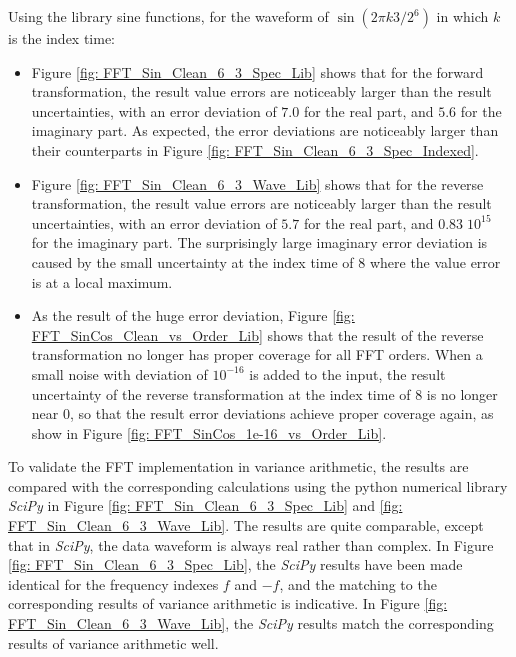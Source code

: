 \documentclass[twoside]{article}
\numberwithin{equation}{section}
\begin{document}
Using the library sine functions, for the waveform of $\sin(2\pi k 3/2^6)$ in which $k$ is the index time:
\begin{itemize}
\item Figure \ref{fig: FFT_Sin_Clean_6_3_Spec_Lib} shows that for the forward transformation, the result value errors are noticeably larger than the result uncertainties, with an error deviation of $7.0$ for the real part, and $5.6$ for the imaginary part.
As expected, the error deviations are noticeably larger than their counterparts in Figure \ref{fig: FFT_Sin_Clean_6_3_Spec_Indexed}.

\item Figure \ref{fig: FFT_Sin_Clean_6_3_Wave_Lib} shows that for the reverse transformation, the result value errors are noticeably larger than the result uncertainties, with an error deviation of $5.7$ for the real part, and $	0.83 \; 10^{15}$ for the imaginary part. 
The surprisingly large imaginary error deviation is caused by the small uncertainty at the index time of $8$ where the value error is at a local maximum.

\item As the result of the huge error deviation, Figure \ref{fig: FFT_SinCos_Clean_vs_Order_Lib} shows that the result of the reverse transformation no longer has proper coverage for all FFT orders.
When a small noise with deviation of $10^{-16}$ is added to the input, the result uncertainty of the reverse transformation at the index time of $8$ is no longer near $0$, so that the result error deviations achieve proper coverage again, as show in Figure \ref{fig: FFT_SinCos_1e-16_vs_Order_Lib}.

\end{itemize}

To validate the FFT implementation in variance arithmetic, the results are compared with the corresponding calculations using the python numerical library \textit{SciPy} in Figure \ref{fig: FFT_Sin_Clean_6_3_Spec_Lib} and \ref{fig: FFT_Sin_Clean_6_3_Wave_Lib}.
The results are quite comparable, except that in \textit{SciPy}, the data waveform is always real rather than complex.
In Figure \ref{fig: FFT_Sin_Clean_6_3_Spec_Lib}, the \textit{SciPy} results have been made identical for the frequency indexes $f$ and $-f$, and the matching to the corresponding results of variance arithmetic is indicative.
In Figure \ref{fig: FFT_Sin_Clean_6_3_Wave_Lib}, the \textit{SciPy} results match the corresponding results of variance arithmetic well.
\end{document}

